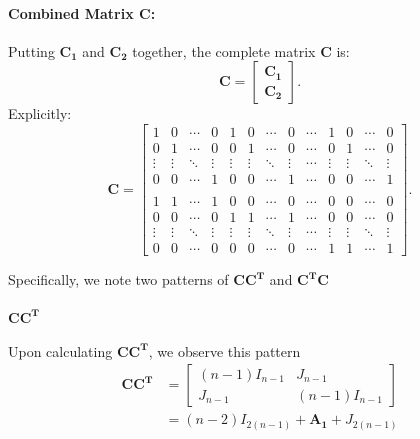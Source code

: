 \documentclass{article}
\begin{document}
\paragraph{Combined Matrix \( \mathbf{C} \):}

Putting \( \mathbf{C_1} \) and \( \mathbf{C_2} \) together, the complete matrix \( \mathbf{C} \) is:
\[
\mathbf{C} = 
\begin{bmatrix}
\mathbf{C_1} \\ 
\mathbf{C_2}
\end{bmatrix}.
\]
Explicitly:
\[
\mathbf{C} = 
\begin{bmatrix}
1 & 0 & \cdots & 0 & 1 & 0 & \cdots & 0 & \cdots & 1 & 0 & \cdots & 0 \\
0 & 1 & \cdots & 0 & 0 & 1 & \cdots & 0 & \cdots & 0 & 1 & \cdots & 0 \\
\vdots & \vdots & \ddots & \vdots & \vdots & \vdots & \ddots & \vdots & \cdots & \vdots & \vdots & \ddots & \vdots \\
0 & 0 & \cdots & 1 & 0 & 0 & \cdots & 1 & \cdots & 0 & 0 & \cdots & 1 \\ \\
1 & 1 & \cdots & 1 & 0 & 0 & \cdots & 0 & \cdots & 0 & 0 & \cdots & 0 \\
0 & 0 & \cdots & 0 & 1 & 1 & \cdots & 1 & \cdots & 0 & 0 & \cdots & 0 \\
\vdots & \vdots & \ddots & \vdots & \vdots & \vdots & \ddots & \vdots & \cdots & \vdots & \vdots & \ddots & \vdots \\
0 & 0 & \cdots & 0 & 0 & 0 & \cdots & 0 & \cdots & 1 & 1 & \cdots & 1
\end{bmatrix}.
\]

Specifically, we note two patterns of \(\mathbf{CC^T}\) and \(\mathbf{C^T C}\)

\paragraph{\(\mathbf{CC^T}\)}
Upon calculating \(\mathbf{CC^T}\), we observe this pattern
\begin{align*}
\mathbf{CC^T} &=
\begin{bmatrix}
    (n-1)I_{n-1} & J_{n-1} \\
    J_{n-1} & (n-1)I_{n-1}
\end{bmatrix}\\
&= (n-2)I_{2(n-1)} + \mathbf{A_1} + J_{2(n-1)} 
\end{align*}
\end{document}
